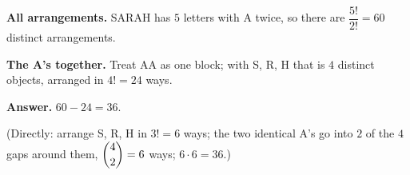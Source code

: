 \textbf{All arrangements.} SARAH has $5$ letters with A twice, so there are $\dfrac{5!}{2!}=60$ distinct arrangements.

\textbf{The A's together.} Treat AA as one block; with S, R, H that is $4$ distinct objects, arranged in $4!=24$ ways.

\textbf{Answer.} $60-24=\boxed{36}$.

(Directly: arrange S, R, H in $3!=6$ ways; the two identical A's go into $2$ of the $4$ gaps around them, $\dbinom42=6$ ways; $6\cdot6=36$.)
